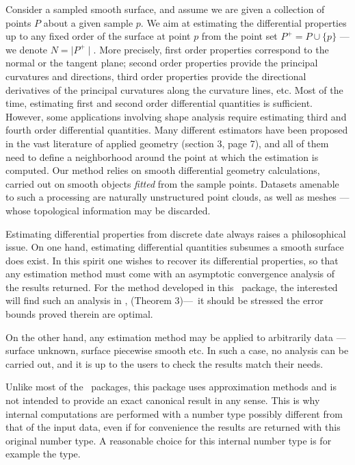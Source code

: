 Consider a sampled smooth surface, and assume we are given a
collection of points $P$ about a given sample $p$. We aim at
estimating the differential properties up to any fixed order of the
surface at point $p$ from the point set $P^+ = P\cup \{ p\}$ --- we
denote $N=\mid P^+\mid$. More precisely, first order properties
correspond to the normal or the tangent plane; second order properties
provide the principal curvatures and directions, third order
properties provide the directional derivatives of the principal
curvatures along the curvature lines, etc.  Most of the time,
estimating first and second order differential quantities is
sufficient.  However, some applications involving shape analysis
require estimating third and fourth order differential quantities.
Many different estimators have been proposed in the vast literature of
applied geometry \cite{cgal:p-smrqt-01} (section 3, page 7), and all
of them need to define a neighborhood around the point at which the
estimation is computed.  Our method relies on smooth differential
geometry calculations, carried out on smooth objects {\em fitted} from
the sample points. 
Datasets amenable to such a processing are naturally unstructured
point clouds, as well as meshes ---whose topological information may
be discarded.

Estimating differential properties from discrete date always raises a
philosophical issue.
On one hand, estimating differential quantities subsumes a smooth
surface does exist.
In this spirit one wishes to recover its differential
properties, so that any estimation method must come with an
asymptotic convergence analysis of the results returned. For the
method developed in this \cgal\ package, the
interested will find such an analysis in
\cite{cgal:cp-edqpf-05}, (Theorem 3)---\ it should be stressed 
the error bounds proved therein are optimal.

On the other hand, any estimation method may be applied to arbitrarily
data ---surface unknown, surface piecewise smooth etc. In such a case,
no analysis can be carried out, and it is up to the users to check the
results match their needs.


Unlike most of the \cgal\ packages, this package uses approximation
methods and is not intended to provide an exact canonical result in
any sense. This is why internal computations are performed with a
number type possibly different from that of the input data, even if
for convenience the results are returned with this original number
type. A reasonable choice for this internal number type is for example
the  type.

